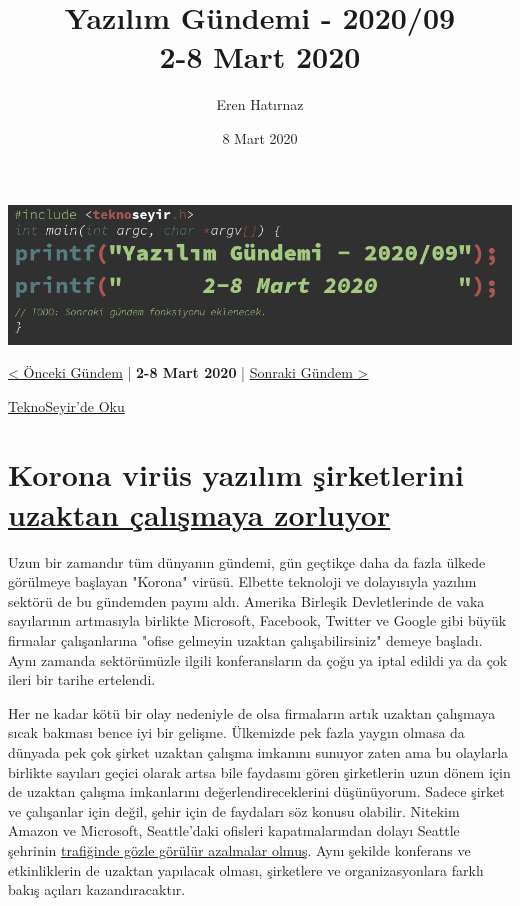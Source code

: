 \documentclass[11pt]{article}
\author{Eren Hatırnaz}
\date{8 Mart 2020}
\title{Yazılım Gündemi - 2020/09\\\medskip
\large 2-8 Mart 2020}
\begin{document}
\maketitle
\tableofcontents \clearpage\shorthandoff{=}

\begin{center}
\includegraphics[width=.9\linewidth]{gorseller/yazilim-gundemi-banner.png}
\end{center}

\begin{center}
\href{../08/yazilim-gundemi-2020-08.pdf}{< Önceki Gündem} | \textbf{2-8 Mart 2020} | \href{../10/yazilim-gundemi-2020-10.pdf}{Sonraki Gündem >}

\href{https://teknoseyir.com/blog/yazilim-gundemi-2020-09}{TeknoSeyir'de Oku}
\end{center}

\section{Korona virüs yazılım şirketlerini \href{https://www.theverge.com/2020/3/5/21166686/coronavirus-amazon-google-facebook-microsoft-twitter-seattle-staff-remote-work}{uzaktan çalışmaya zorluyor}}
\label{sec:org06eec97}
Uzun bir zamandır tüm dünyanın gündemi, gün geçtikçe daha da fazla ülkede
görülmeye başlayan "Korona" virüsü. Elbette teknoloji ve dolayısıyla yazılım
sektörü de bu gündemden payını aldı. Amerika Birleşik Devletlerinde de vaka
sayılarının artmasıyla birlikte Microsoft, Facebook, Twitter ve Google gibi
büyük firmalar çalışanlarına "ofise gelmeyin uzaktan çalışabilirsiniz" demeye
başladı. Aynı zamanda sektörümüzle ilgili konferansların da çoğu ya iptal
edildi ya da çok ileri bir tarihe ertelendi.

Her ne kadar kötü bir olay nedeniyle de olsa firmaların artık uzaktan
çalışmaya sıcak bakması bence iyi bir gelişme. Ülkemizde pek fazla yaygın
olmasa da dünyada pek çok şirket uzaktan çalışma imkanını sunuyor zaten ama bu
olaylarla birlikte sayıları geçici olarak artsa bile faydasını gören
şirketlerin uzun dönem için de uzaktan çalışma imkanlarını
değerlendireceklerini düşünüyorum. Sadece şirket ve çalışanlar için değil,
şehir için de faydaları söz konusu olabilir. Nitekim Amazon ve Microsoft,
Seattle'daki ofisleri kapatmalarından dolayı Seattle şehrinin \href{https://www.geekwire.com/2020/seattle-morning-traffic-disappears-amazon-microsoft-others-enforce-remote-work-policies/}{trafiğinde gözle
görülür azalmalar olmuş}. Aynı şekilde konferans ve etkinliklerin de uzaktan
yapılacak olması, şirketlere ve organizasyonlara farklı bakış açıları
kazandıracaktır.
\end{document}
